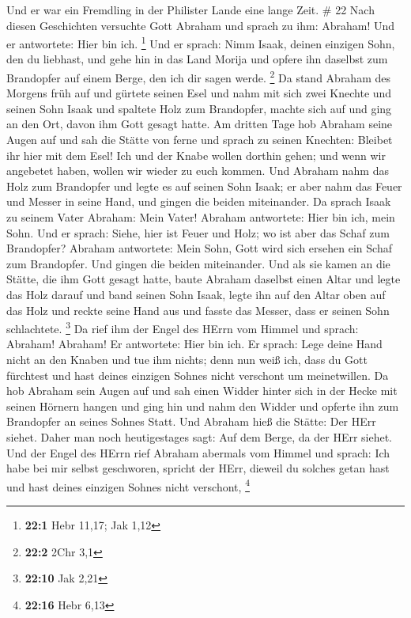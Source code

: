  Und er war ein Fremdling in der Philister Lande eine lange
Zeit. \# 22  Nach diesen Geschichten versuchte Gott Abraham
und sprach zu ihm: Abraham! Und er antwortete: Hier bin ich. \footnote{\textbf{22:1}
  Hebr 11,17; Jak 1,12}  Und er sprach: Nimm Isaak, deinen
einzigen Sohn, den du liebhast, und gehe hin in das Land Morija und
opfere ihn daselbst zum Brandopfer auf einem Berge, den ich dir sagen
werde. \footnote{\textbf{22:2} 2Chr 3,1}  Da stand Abraham
des Morgens früh auf und gürtete seinen Esel und nahm mit sich zwei
Knechte und seinen Sohn Isaak und spaltete Holz zum Brandopfer, machte
sich auf und ging an den Ort, davon ihm Gott gesagt hatte. 
Am dritten Tage hob Abraham seine Augen auf und sah die Stätte von ferne
 und sprach zu seinen Knechten: Bleibet ihr hier mit dem
Esel! Ich und der Knabe wollen dorthin gehen; und wenn wir angebetet
haben, wollen wir wieder zu euch kommen.  Und Abraham nahm
das Holz zum Brandopfer und legte es auf seinen Sohn Isaak; er aber nahm
das Feuer und Messer in seine Hand, und gingen die beiden miteinander.
 Da sprach Isaak zu seinem Vater Abraham: Mein Vater!
Abraham antwortete: Hier bin ich, mein Sohn. Und er sprach: Siehe, hier
ist Feuer und Holz; wo ist aber das Schaf zum Brandopfer? 
Abraham antwortete: Mein Sohn, Gott wird sich ersehen ein Schaf zum
Brandopfer. Und gingen die beiden miteinander.  Und als sie
kamen an die Stätte, die ihm Gott gesagt hatte, baute Abraham daselbst
einen Altar und legte das Holz darauf und band seinen Sohn Isaak, legte
ihn auf den Altar oben auf das Holz  und reckte seine Hand
aus und fasste das Messer, dass er seinen Sohn schlachtete. \footnote{\textbf{22:10}
  Jak 2,21}  Da rief ihm der Engel des HErrn vom Himmel und
sprach: Abraham! Abraham! Er antwortete: Hier bin ich.  Er
sprach: Lege deine Hand nicht an den Knaben und tue ihm nichts; denn nun
weiß ich, dass du Gott fürchtest und hast deines einzigen Sohnes nicht
verschont um meinetwillen.  Da hob Abraham sein Augen auf
und sah einen Widder hinter sich in der Hecke mit seinen Hörnern hangen
und ging hin und nahm den Widder und opferte ihn zum Brandopfer an
seines Sohnes Statt.  Und Abraham hieß die Stätte: Der HErr
siehet. Daher man noch heutigestages sagt: Auf dem Berge, da der HErr
siehet.  Und der Engel des HErrn rief Abraham abermals vom
Himmel  und sprach: Ich habe bei mir selbst geschworen,
spricht der HErr, dieweil du solches getan hast und hast deines einzigen
Sohnes nicht verschont, \footnote{\textbf{22:16} Hebr 6,13}

